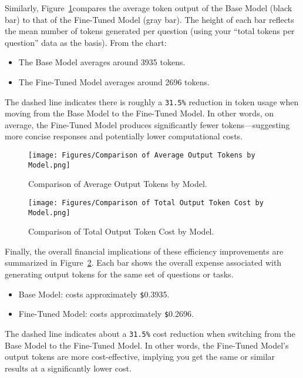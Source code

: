 \documentclass[12pt,oneside,openany]{report}
\begin{document}
Similarly, Figure~\ref{fig:avg-output-tokens}compares the average token output of the Base Model (black bar) to that of the Fine-Tuned Model (gray bar). The height of each bar reflects the mean number of tokens generated per question (using your “total tokens per question” data as the basis). From the chart:

\begin{itemize}

     \item The Base Model averages around 3935 tokens.
     
     \item The Fine-Tuned Model averages around 2696 tokens.
\end{itemize}
     
The dashed line indicates there is roughly a \verb|31.5%| reduction in token usage when moving from the Base Model to the Fine-Tuned Model. In other words, on average, the Fine-Tuned Model produces significantly fewer tokens—suggesting more concise responses and potentially lower computational costs.


\begin{figure}[H]
    \centering
    \texttt{[image: Figures/Comparison of Average Output Tokens by Model.png]}
    \caption{Comparison of Average Output Tokens by Model.}
    \label{fig:avg-output-tokens}
\end{figure}


\begin{figure}[ht]
    \centering
    \texttt{[image: Figures/Comparison of Total Output Token Cost by Model.png]}
    \caption{Comparison of Total Output Token Cost by Model.}
    \label{fig:output-token-cost}
\end{figure}

Finally, the overall financial implications of these efficiency improvements are summarized in Figure \ref{fig:output-token-cost}. Each bar shows the overall expense associated with generating output tokens for the same set of questions or tasks. 

\begin{itemize}
    

    \item Base Model: costs approximately \verb|$|0.3935.
    \item Fine-Tuned Model: costs approximately \verb|$|0.2696.

\end{itemize}
The dashed line indicates about a \verb|31.5%| cost reduction when switching from the Base Model to the Fine-Tuned Model. In other words, the Fine-Tuned Model’s output tokens are more cost-effective, implying you get the same or similar results at a significantly lower cost.
\end{document}
